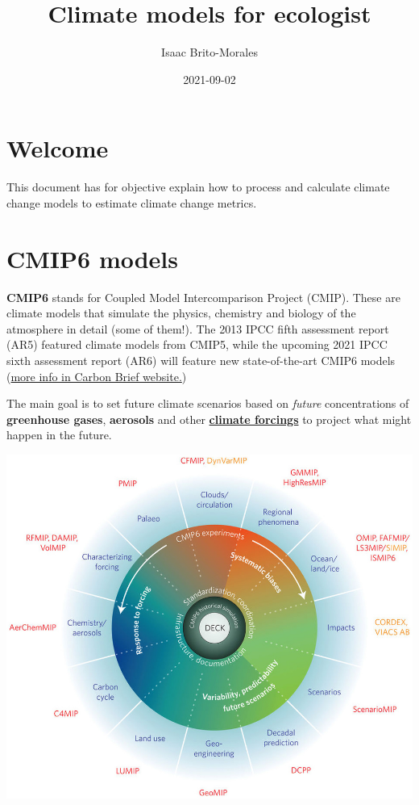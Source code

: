 \documentclass[]{book}
\title{Climate models for ecologist}
\author{Isaac Brito-Morales}
\date{2021-09-02}
\begin{document}
\maketitle

{
\setcounter{tocdepth}{1}
\tableofcontents
}
\hypertarget{welcome}{%
\chapter{Welcome}\label{welcome}}

This document has for objective explain how to process and calculate climate change models to estimate climate change metrics.

\hypertarget{cmip6-models}{%
\chapter{CMIP6 models}\label{cmip6-models}}

\textbf{CMIP6} stands for Coupled Model Intercomparison Project (CMIP). These are climate models that simulate the physics, chemistry and biology of the atmosphere in detail (some of them!). The 2013 IPCC fifth assessment report (AR5) featured climate models from CMIP5, while the upcoming 2021 IPCC sixth assessment report (AR6) will feature new state-of-the-art CMIP6 models (\href{https://www.carbonbrief.org/cmip6-the-next-generation-of-climate-models-explained}{more info in Carbon Brief website.})

The main goal is to set future climate scenarios based on \emph{future} concentrations of \textbf{greenhouse gases}, \textbf{aerosols} and other \href{https://www.carbonbrief.org/qa-how-do-climate-models-work\#inout}{\textbf{climate forcings}} to project what might happen in the future.

\begin{center}\includegraphics[width=1\linewidth]{images/cmip6_mips} \end{center}
\end{document}
